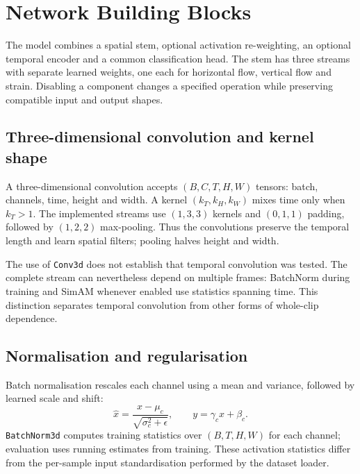
\section{Network Building Blocks}
\label{sec:building-blocks}

The model combines a spatial stem, optional activation re-weighting, an optional temporal encoder and a common classification head. The stem has three streams with separate learned weights, one each for horizontal flow, vertical flow and strain. Disabling a component changes a specified operation while preserving compatible input and output shapes.

\subsection{Three-dimensional convolution and kernel shape}
\label{sec:conv3d}

A three-dimensional convolution accepts $(B,C,T,H,W)$ tensors: batch, channels, time, height and width. A kernel $(k_T,k_H,k_W)$ mixes time only when $k_T>1$. The implemented streams use $(1,3,3)$ kernels and $(0,1,1)$ padding, followed by $(1,2,2)$ max-pooling. Thus the convolutions preserve the temporal length and learn spatial filters; pooling halves height and width.

The use of \texttt{Conv3d} does not establish that temporal convolution was tested. The complete stream can nevertheless depend on multiple frames: BatchNorm during training and SimAM whenever enabled use statistics spanning time. This distinction separates temporal convolution from other forms of whole-clip dependence.

\subsection{Normalisation and regularisation}
\label{sec:normalisation}

Batch normalisation rescales each channel using a mean and variance, followed by learned scale and shift:
\[
    \widehat x=\frac{x-\mu_c}{\sqrt{\sigma_c^2+\epsilon}},
    \qquad y=\gamma_c\widehat x+\beta_c.
\]
\texttt{BatchNorm3d} computes training statistics over $(B,T,H,W)$ for each channel; evaluation uses running estimates from training. These activation statistics differ from the per-sample input standardisation performed by the dataset loader.

